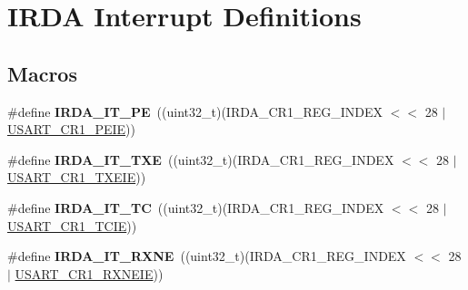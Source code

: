 \hypertarget{group___i_r_d_a___interrupt__definition}{}\section{I\+R\+DA Interrupt Definitions}
\label{group___i_r_d_a___interrupt__definition}
\subsection*{Macros}
\begin{DoxyCompactItemize}
\item 
\#define {\bfseries I\+R\+D\+A\+\_\+\+I\+T\+\_\+\+PE}~((uint32\+\_\+t)(I\+R\+D\+A\+\_\+\+C\+R1\+\_\+\+R\+E\+G\+\_\+\+I\+N\+D\+EX $<$$<$ 28 $\vert$ \hyperlink{group___peripheral___registers___bits___definition_ga27405d413b6d355ccdb076d52fef6875}{U\+S\+A\+R\+T\+\_\+\+C\+R1\+\_\+\+P\+E\+IE}))\hypertarget{group___i_r_d_a___interrupt__definition_ga1d2b4b601ece8f1ab0b2542412bb2533}{}\label{group___i_r_d_a___interrupt__definition_ga1d2b4b601ece8f1ab0b2542412bb2533}

\item 
\#define {\bfseries I\+R\+D\+A\+\_\+\+I\+T\+\_\+\+T\+XE}~((uint32\+\_\+t)(I\+R\+D\+A\+\_\+\+C\+R1\+\_\+\+R\+E\+G\+\_\+\+I\+N\+D\+EX $<$$<$ 28 $\vert$ \hyperlink{group___peripheral___registers___bits___definition_ga70422871d15f974b464365e7fe1877e9}{U\+S\+A\+R\+T\+\_\+\+C\+R1\+\_\+\+T\+X\+E\+IE}))\hypertarget{group___i_r_d_a___interrupt__definition_ga5e81e9fd3d52bafcf21281c10d2ca257}{}\label{group___i_r_d_a___interrupt__definition_ga5e81e9fd3d52bafcf21281c10d2ca257}

\item 
\#define {\bfseries I\+R\+D\+A\+\_\+\+I\+T\+\_\+\+TC}~((uint32\+\_\+t)(I\+R\+D\+A\+\_\+\+C\+R1\+\_\+\+R\+E\+G\+\_\+\+I\+N\+D\+EX $<$$<$ 28 $\vert$ \hyperlink{group___peripheral___registers___bits___definition_gaa17130690a1ca95b972429eb64d4254e}{U\+S\+A\+R\+T\+\_\+\+C\+R1\+\_\+\+T\+C\+IE}))\hypertarget{group___i_r_d_a___interrupt__definition_gadd3e4b796b67db171ca04c5297d4e667}{}\label{group___i_r_d_a___interrupt__definition_gadd3e4b796b67db171ca04c5297d4e667}

\item 
\#define {\bfseries I\+R\+D\+A\+\_\+\+I\+T\+\_\+\+R\+X\+NE}~((uint32\+\_\+t)(I\+R\+D\+A\+\_\+\+C\+R1\+\_\+\+R\+E\+G\+\_\+\+I\+N\+D\+EX $<$$<$ 28 $\vert$ \hyperlink{group___peripheral___registers___bits___definition_ga91118f867adfdb2e805beea86666de04}{U\+S\+A\+R\+T\+\_\+\+C\+R1\+\_\+\+R\+X\+N\+E\+IE}))\hypertarget{group___i_r_d_a___interrupt__definition_ga8f2de9c6c3cccfb2de0277ce10f23b13}{}\label{group___i_r_d_a___interrupt__definition_ga8f2de9c6c3cccfb2de0277ce10f23b13}


\end{DoxyCompactItemize}
